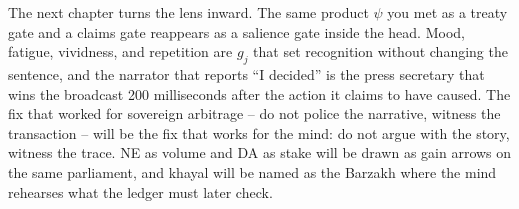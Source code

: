 The next chapter turns the lens inward. The same product $\psi$ you met as a treaty gate and a claims gate reappears as a salience gate inside the head. Mood, fatigue, vividness, and repetition are $g_j$ that set recognition without changing the sentence, and the narrator that reports ``I decided'' is the press secretary that wins the broadcast 200 milliseconds after the action it claims to have caused. The fix that worked for sovereign arbitrage -- do not police the narrative, witness the transaction -- will be the fix that works for the mind: do not argue with the story, witness the trace. NE as volume and DA as stake will be drawn as gain arrows on the same parliament, and khayal will be named as the Barzakh where the mind rehearses what the ledger must later check.
